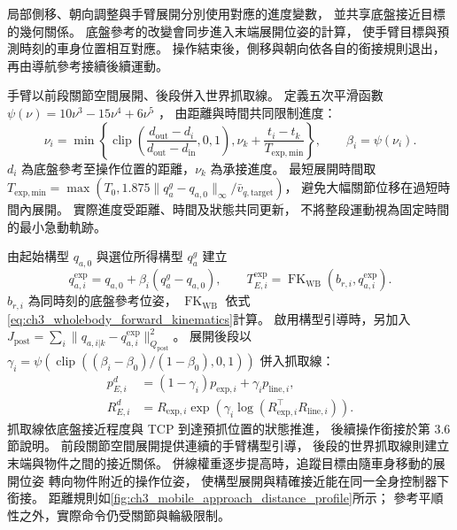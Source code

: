 局部側移、朝向調整與手臂展開分別使用對應的進度變數，
並共享底盤接近目標的幾何關係。
底盤參考的改變會同步進入末端展開位姿的計算，
使手臂目標與預測時刻的車身位置相互對應。
操作結束後，側移與朝向依各自的銜接規則退出，
再由導航參考接續後續運動。

手臂以前段關節空間展開、後段併入世界抓取線。
定義五次平滑函數
$\psi(\nu)=10\nu^3-15\nu^4+6\nu^5$
\cite{flash1985coordination}，
由距離與時間共同限制進度：
\begin{equation}
    \nu_i=
    \min\left\{
        \operatorname{clip}\left(
        \frac{d_{\mathrm{out}}-d_i}{d_{\mathrm{out}}-d_{\mathrm{in}}},0,1\right),
        \nu_k+\frac{t_i-t_k}{T_{\mathrm{exp,min}}}
    \right\},
    \qquad \beta_i=\psi(\nu_i).
    \label{eq:ch3_distance_based_arm_progress}
\end{equation}
$d_i$ 為底盤參考至操作位置的距離，$\nu_k$ 為承接進度。
最短展開時間取
$T_{\mathrm{exp,min}}=\max(T_0,
1.875\|q_a^g-q_{a,0}\|_\infty/\bar v_{q,\mathrm{target}})$，
避免大幅關節位移在過短時間內展開。
實際進度受距離、時間及狀態共同更新，
不將整段運動視為固定時間的最小急動軌跡。

由起始構型 $q_{a,0}$ 與選位所得構型 $q_a^g$ 建立
\begin{equation}
    q_{a,i}^{\mathrm{exp}}=q_{a,0}+\beta_i(q_a^g-q_{a,0}),\qquad
    T_{E,i}^{\mathrm{exp}}=
    \operatorname{FK}_{\mathrm{WB}}(b_{r,i},q_{a,i}^{\mathrm{exp}}).
    \label{eq:ch3_joint_space_unfold_reference}
\end{equation}
$b_{r,i}$ 為同時刻的底盤參考位姿，
$\operatorname{FK}_{\mathrm{WB}}$ 依式\eqref{eq:ch3_wholebody_forward_kinematics}計算。
啟用構型引導時，另加入
$J_{\mathrm{post}}=\sum_i
\|q_{a,i|k}-q_{a,i}^{\mathrm{exp}}\|_{Q_{\mathrm{post}}}^2$。
展開後段以
$\gamma_i=\psi(\operatorname{clip}((\beta_i-\beta_0)/(1-\beta_0),0,1))$
併入抓取線：
\begin{equation}
    \begin{aligned}
        p_{E,i}^{d}&=(1-\gamma_i)p_{\mathrm{exp},i}
                     +\gamma_i p_{\mathrm{line},i},\\
        R_{E,i}^{d}&=R_{\mathrm{exp},i}
        \exp\left(\gamma_i\log(R_{\mathrm{exp},i}^{\top}R_{\mathrm{line},i})\right).
    \end{aligned}
    \label{eq:ch3_continuous_approach_reference}
\end{equation}
抓取線依底盤接近程度與 TCP 到達預抓位置的狀態推進，
後續操作銜接於第 3.6 節說明。
前段關節空間展開提供連續的手臂構型引導，
後段的世界抓取線則建立末端與物件之間的接近關係。
併線權重逐步提高時，追蹤目標由隨車身移動的展開位姿
轉向物件附近的操作位姿，
使構型展開與精確接近能在同一全身控制器下銜接。
距離規則如\cref{fig:ch3_mobile_approach_distance_profile}所示；
參考平順性之外，實際命令仍受關節與輪級限制。


